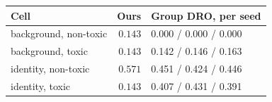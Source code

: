 \begin{tabular}{lrl}
\toprule
Cell & Ours & Group DRO, per seed \\
\midrule
background, non-toxic & $0.143$ & 0.000 / 0.000 / 0.000 \\
background, toxic & $0.143$ & 0.142 / 0.146 / 0.163 \\
identity, non-toxic & $0.571$ & 0.451 / 0.424 / 0.446 \\
identity, toxic & $0.143$ & 0.407 / 0.431 / 0.391 \\
\bottomrule
\end{tabular}
